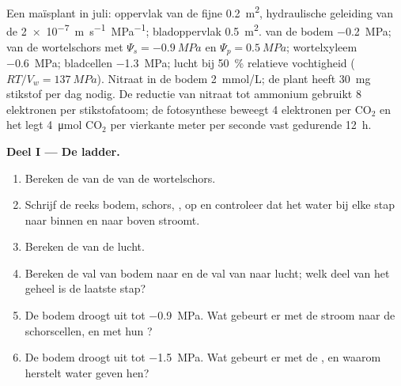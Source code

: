 \begin{problem}
\label{pb:b1:plant-water-minerals:1}
Een maïsplant in juli: oppervlak van de fijne  \qty{0.2}{m^2},
hydraulische geleiding van de  \qty{2e-7}{m.s^{-1}.MPa^{-1}};
bladoppervlak \qty{0.5}{m^2}.  van de bodem
\qty{-0.2}{MPa};  van de wortelschors met $\Psi_s = \qty{-0.9}{MPa}$
en $\Psi_p = \qty{0.5}{MPa}$; wortelxyleem \qty{-0.6}{MPa}; bladcellen
\qty{-1.3}{MPa}; lucht bij \qty{50}{\%} relatieve vochtigheid
($RT/V_w = \qty{137}{MPa}$). Nitraat in de bodem \qty{2}{mmol/L}; de plant
heeft \qty{30}{mg} stikstof per dag nodig. De reductie van nitraat tot
ammonium gebruikt 8 elektronen per stikstofatoom; de fotosynthese beweegt 4
elektronen per $\mathrm{CO_2}$ en het  legt \qty{4}{\micro mol}
$\mathrm{CO_2}$ per vierkante meter per seconde vast gedurende
\qty{12}{h}.

\medskip
\noindent\textbf{Deel I --- De ladder.}
\begin{enumerate}
  \item Bereken de  van de  van de wortelschors.
  \item Schrijf de reeks bodem, schors, ,  op en controleer dat
        het water bij elke stap naar binnen en naar boven stroomt.
  \item Bereken de  van de lucht.
  \item Bereken de val van bodem naar  en de val van  naar lucht;
        welk deel van het geheel is de laatste stap?
  \item De bodem droogt uit tot \qty{-0.9}{MPa}. Wat gebeurt er met de
        stroom naar de schorscellen, en met hun ?
  \item De bodem droogt uit tot \qty{-1.5}{MPa}. Wat gebeurt er met de
        , en waarom herstelt water geven hen?
\end{enumerate}


\end{problem}
